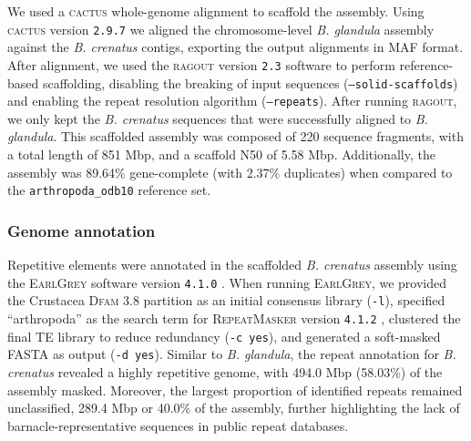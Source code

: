 \documentclass[11pt]{article}
\begin{document}
We used a \textsc{cactus} whole-genome alignment \citep{armstrong_progressive_2020} to
scaffold the assembly.
Using \textsc{cactus} version \texttt{2.9.7} we aligned the chromosome-level
\textit{B. glandula} assembly against the \textit{B. crenatus} contigs,
exporting the output alignments in MAF format.
After alignment, we used the \textsc{ragout} version \texttt{2.3} software
\citep{kolmogorov_ragout_2018} to perform reference-based scaffolding, disabling
the breaking of input sequences (\texttt{--solid-scaffolds}) and enabling the
repeat resolution algorithm (\texttt{--repeats}).
After running \textsc{ragout}, we only kept the \textit{B. crenatus} sequences that
were successfully aligned to \textit{B. glandula}.
This scaffolded assembly was composed of 220 sequence fragments, with a total length
of 851 Mbp, and a scaffold N50 of 5.58 Mbp.
Additionally, the assembly was 89.64\% gene-complete (with 2.37\% duplicates) when
compared to the \texttt{arthropoda\_odb10} reference set.

\subsubsection*{Genome annotation}

Repetitive elements were annotated in the scaffolded \textit{B. crenatus} assembly
using the \textsc{EarlGrey} software version \texttt{4.1.0} \citep{baril_earl_2024}.
When running \textsc{EarlGrey}, we provided the Crustacea \textsc{Dfam 3.8} partition
as an initial consensus library (\texttt{-l}), specified ``arthropoda'' as the
search term for \textsc{RepeatMasker} version \texttt{4.1.2}
\citep{smit_repeatmasker_2013}, clustered the final TE library to reduce redundancy
(\texttt{-c yes}), and generated a soft-masked FASTA as output (\texttt{-d yes}).
Similar to \textit{B. glandula}, the repeat annotation for \textit{B. crenatus}
revealed a highly repetitive genome, with 494.0 Mbp (58.03\%) of the assembly
masked.
Moreover, the largest proportion of identified repeats remained unclassified,
289.4 Mbp or 40.0\% of the assembly, further highlighting the lack of
barnacle-representative sequences in public repeat databases.
\vspace{0.2cm}
\end{document}
